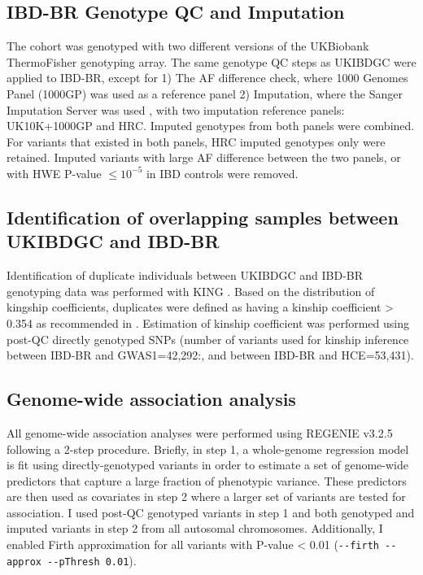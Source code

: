\subsection{IBD-BR Genotype QC and Imputation}
The cohort was genotyped with two different versions of the UKBiobank ThermoFisher genotyping array. The same genotype QC steps as UKIBDGC were applied to IBD-BR, except for 1) The AF difference check, where 1000 Genomes Panel (1000GP) was used as a reference panel 2) Imputation, where the Sanger Imputation Server was used \cite{1000gp}, with two imputation reference panels: UK10K+1000GP and HRC. Imputed genotypes from both panels were combined. For variants that existed in both panels, HRC imputed genotypes only were retained. Imputed variants with large AF difference between the two panels, or with HWE P-value $ \leq 10^{-5}$ in IBD controls  were removed.


\subsection{Identification of overlapping samples between UKIBDGC and IBD-BR}
Identification of duplicate individuals between UKIBDGC and IBD-BR genotyping data was performed with KING \cite{king-software}. Based on the distribution of kingship coefficients, duplicates were defined as having a kinship coefficient > 0.354 as recommended in \cite{king-software}. Estimation of kinship coefficient was performed using post-QC directly genotyped SNPs (number of variants used for kinship inference between IBD-BR and GWAS1=42,292:, and between IBD-BR and HCE=53,431).

\subsection{Genome-wide association analysis}
All genome-wide association analyses were performed using REGENIE v3.2.5 \cite{Mbatchou2021-qm} following a 2-step procedure. Briefly, in step 1, a whole-genome regression model is fit using directly-genotyped variants in order to estimate a set of genome-wide predictors that capture a large fraction of phenotypic variance. These predictors are then used as covariates in step 2 where a larger set of variants are tested for association.
I used post-QC genotyped variants in step 1 and both genotyped and imputed variants in step 2 from all autosomal chromosomes. Additionally, I enabled Firth approximation for all variants with P-value < 0.01 (\Verb+--firth --approx --pThresh 0.01+).

